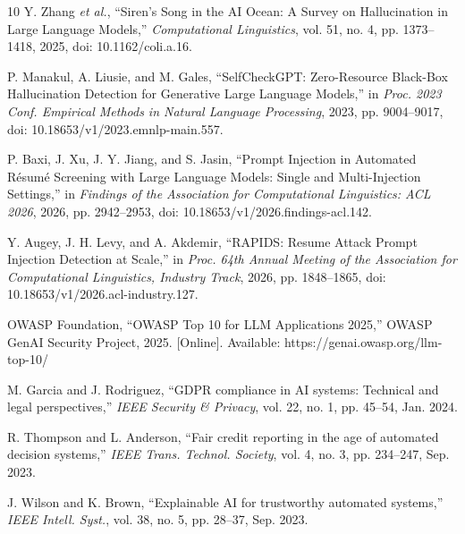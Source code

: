 \documentclass[conference]{IEEEtran}
\begin{document}
\begin{thebibliography}{10}
Y. Zhang \emph{et al.},
``Siren's Song in the AI Ocean: A Survey on Hallucination in Large Language Models,''
\emph{Computational Linguistics}, vol. 51, no. 4, pp. 1373--1418, 2025, doi: 10.1162/coli.a.16.

P. Manakul, A. Liusie, and M. Gales,
``SelfCheckGPT: Zero-Resource Black-Box Hallucination Detection for Generative Large Language Models,''
in \emph{Proc. 2023 Conf. Empirical Methods in Natural Language Processing}, 2023, pp. 9004--9017, doi: 10.18653/v1/2023.emnlp-main.557.

P. Baxi, J. Xu, J. Y. Jiang, and S. Jasin,
``Prompt Injection in Automated R\'{e}sum\'{e} Screening with Large Language Models: Single and Multi-Injection Settings,''
in \emph{Findings of the Association for Computational Linguistics: ACL 2026}, 2026, pp. 2942--2953, doi: 10.18653/v1/2026.findings-acl.142.

Y. Augey, J. H. Levy, and A. Akdemir,
``RAPIDS: Resume Attack Prompt Injection Detection at Scale,''
in \emph{Proc. 64th Annual Meeting of the Association for Computational Linguistics, Industry Track}, 2026, pp. 1848--1865, doi: 10.18653/v1/2026.acl-industry.127.

OWASP Foundation,
``OWASP Top 10 for LLM Applications 2025,''
OWASP GenAI Security Project, 2025. [Online]. Available: https://genai.owasp.org/llm-top-10/

M. Garcia and J. Rodriguez,
``GDPR compliance in AI systems: Technical and legal perspectives,''
\emph{IEEE Security \& Privacy}, vol. 22, no. 1, pp. 45--54, Jan. 2024.

R. Thompson and L. Anderson,
``Fair credit reporting in the age of automated decision systems,''
\emph{IEEE Trans. Technol. Society}, vol. 4, no. 3, pp. 234--247, Sep. 2023.

J. Wilson and K. Brown,
``Explainable AI for trustworthy automated systems,''
\emph{IEEE Intell. Syst.}, vol. 38, no. 5, pp. 28--37, Sep. 2023.

\end{thebibliography}
\end{document}
